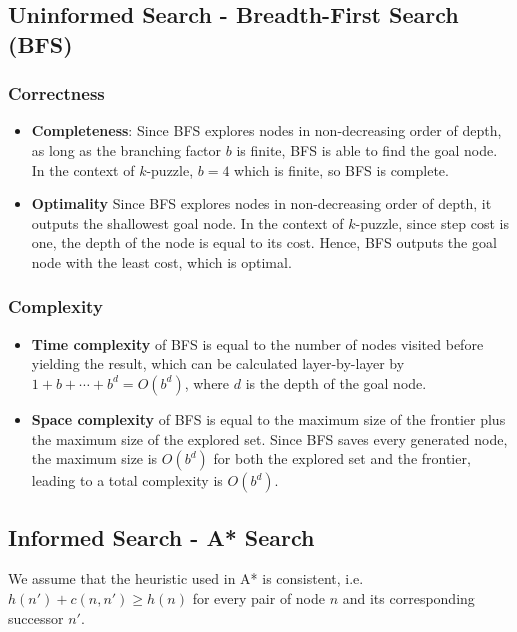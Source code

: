 \documentclass{llncs}
\begin{document}
\subsection{Uninformed Search - Breadth-First Search (BFS)}
\subsubsection{Correctness}
\begin{itemize}
	\item[] \textbf{Completeness}:
	Since BFS explores nodes in non-decreasing order of depth, as long as the branching factor $b$ is finite, BFS is able to find the goal node. In the context of $k$-puzzle, $b=4$ which is finite, so BFS is complete.
	\item[] \textbf{Optimality}
	Since BFS explores nodes in non-decreasing order of depth, it outputs the shallowest goal node. In the context of $k$-puzzle, since step cost is one, the depth of the node is equal to its cost. Hence, BFS outputs the goal node with the least cost, which is optimal.
\end{itemize}
\subsubsection{Complexity}
\begin{itemize}
	\item[] \textbf{Time complexity} of BFS is equal to the number of nodes visited before yielding the result, which can be calculated layer-by-layer by $1+b+\cdots +b^d = O(b^d)$, where $d$ is the depth of the goal node.
	\item[] \textbf{Space complexity} of BFS is equal to the maximum size of the frontier plus the maximum size of the explored set. Since BFS saves every generated node, the maximum size is $O(b^d)$ for both the explored set and the frontier, leading to a total complexity is $O(b^d)$.
\end{itemize}

\subsection{Informed Search - A* Search}
We assume that the heuristic used in A* is consistent, i.e. $h(n')+c(n,n') \geq h(n)$ for every pair of node $n$ and its corresponding successor $n'$.
\end{document}

